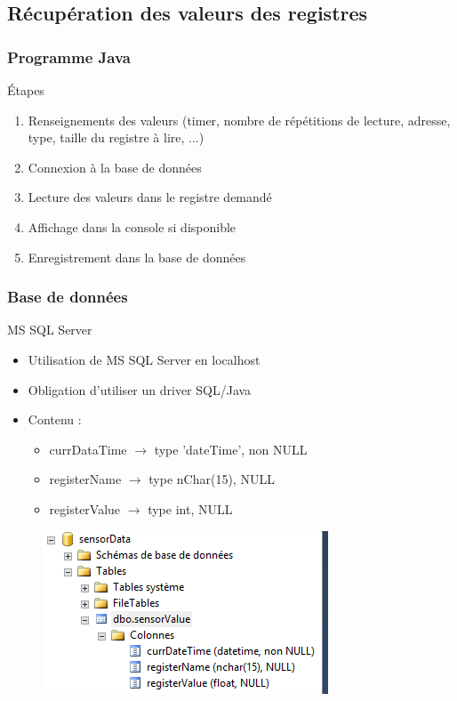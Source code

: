 \documentclass[12pt]{beamer}
\begin{document}
	\subsection{Récupération des valeurs des registres}
	\begin{frame}[allowframebreaks]
	\frametitle{Programme Java}
		\begin{block}{Étapes}
				\begin{enumerate}
					\item Renseignements des valeurs (timer, nombre de répétitions de lecture, adresse, type, taille du registre à lire, ...)
					\item Connexion à la base de données
					\item Lecture des valeurs dans le registre demandé
					\item Affichage dans la console si disponible
					\item Enregistrement dans la base de données
				\end{enumerate}
		\end{block}
	\end{frame}
	
	\begin{frame}[allowframebreaks]
	\frametitle{Base de données}
		\begin{block}{MS SQL Server}
				\begin{itemize}
					[square]
					\item Utilisation de MS SQL Server en localhost
					\item Obligation d'utiliser un driver SQL/Java
					\item Contenu :
						\begin{itemize}
							[cercle]
							\item currDataTime $\rightarrow$ type 'dateTime', non NULL
							\item registerName $\rightarrow$ type nChar(15), NULL
							\item registerValue $\rightarrow$ type int, NULL
						\end{itemize}
				\end{itemize}
		\end{block}
		
		\begin{figure}[H]
			\centering
			\includegraphics[scale=0.3]{dataBase.png}
			\label{fig:db}
		\end{figure}
	\end{frame}
	
\end{document}
